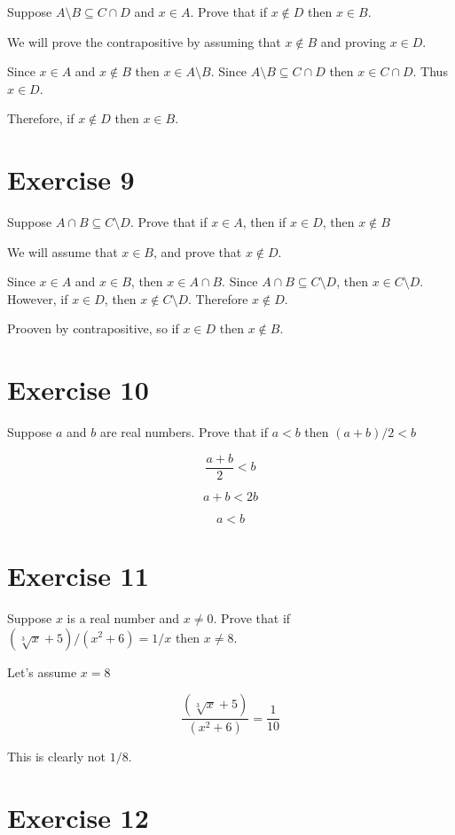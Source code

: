 \documentclass[11pt]{article}
\begin{document}
Suppose $A \setminus B \subseteq C \cap D$ and $x \in A$. Prove that if 
$x \notin D$ then $x \in B$.

We will prove the contrapositive by assuming that $x \notin B$ and proving 
$x \in D$.

Since $x \in A$ and $x \notin B$ then $x \in A \setminus B$. Since 
$A \setminus B \subseteq C \cap D$ then $x \in C \cap D$. Thus $x \in D$.

Therefore, if $x \notin D$ then $x \in B$.


\section*{Exercise 9}

Suppose $A \cap B \subseteq C \setminus D$. Prove that if $x \in A$, then if 
$x \in D$, then $x \notin B$

We will assume that $x \in B$, and prove that $x \notin D$.

Since $x \in A$ and $x \in B$, then $x \in A \cap B$. Since 
$A \cap B \subseteq C \setminus D$, then $x \in C \setminus D$. 
However, if $x \in D$, then $x \notin C \setminus D$. 
Therefore $x \notin D$.

Prooven by contrapositive, so if $x \in D$ then $x \notin B$.

\section*{Exercise 10}

Suppose $a$ and $b$ are real numbers. Prove that if $a < b$ then $(a + b)/2<b$

$$\frac{a + b}{2} < b$$

$$a + b < 2b$$

$$a < b$$

\section*{Exercise 11}

Suppose $x$ is a real number and $x \neq 0$. Prove that if 
$(\sqrt[3]{x} + 5)/(x^2 + 6) = 1/x$ then $x \neq 8$.

Let's assume $x = 8$

$$\frac{(\sqrt[3]{x} + 5)}{(x^2 + 6)} = \frac{1}{10}$$

This is clearly not $1/8$.

\section*{Exercise 12}
\end{document}

